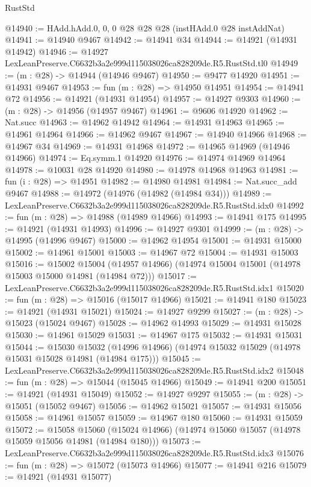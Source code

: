 \begin{lexlean}{RustStd}
\begin{coremodule}
@14940 := HAdd.hAdd.{0, 0, 0} @28 @28 @28 (instHAdd.{0} @28 instAddNat)
@14941 := @14940 @9467
@14942 := @14941 @34
@14944 := @14921 (@14931 @14942)
@14946 := @14927 LexLeanPreserve.C6632b3a2e999d115038026ca828209de.R5.RustStd.tl0
@14949 := (m : @28) -> @14944 (@14946 @9467)
@14950 := @9477 @14920
@14951 := @14931 @9467
@14953 := fun (m : @28) => @14950 @14951
@14954 := @14941 @72
@14956 := @14921 (@14931 @14954)
@14957 := @14927 @9303
@14960 := (m : @28) -> @14956 (@14957 @9467)
@14961 := @9606 @14920
@14962 := Nat.succ
@14963 := @14962 @14942
@14964 := @14931 @14963
@14965 := @14961 @14964
@14966 := @14962 @9467
@14967 := @14940 @14966
@14968 := @14967 @34
@14969 := @14931 @14968
@14972 := @14965 @14969 (@14946 @14966)
@14974 := Eq.symm.{1} @14920
@14976 := @14974 @14969 @14964
@14978 := @10031 @28 @14920
@14980 := @14978 @14968 @14963
@14981 := fun (i : @28) => @14951
@14982 := @14980 @14981
@14984 := Nat.succ_add @9467
@14988 := @14972 (@14976 (@14982 (@14984 @34)))
@14989 := LexLeanPreserve.C6632b3a2e999d115038026ca828209de.R5.RustStd.idx0
@14992 := fun (m : @28) => @14988 (@14989 @14966)
@14993 := @14941 @175
@14995 := @14921 (@14931 @14993)
@14996 := @14927 @9301
@14999 := (m : @28) -> @14995 (@14996 @9467)
@15000 := @14962 @14954
@15001 := @14931 @15000
@15002 := @14961 @15001
@15003 := @14967 @72
@15004 := @14931 @15003
@15016 := @15002
    @15004
    (@14957 @14966)
    (@14974 @15004 @15001 (@14978 @15003 @15000 @14981 (@14984 @72)))
@15017 := LexLeanPreserve.C6632b3a2e999d115038026ca828209de.R5.RustStd.idx1
@15020 := fun (m : @28) => @15016 (@15017 @14966)
@15021 := @14941 @180
@15023 := @14921 (@14931 @15021)
@15024 := @14927 @9299
@15027 := (m : @28) -> @15023 (@15024 @9467)
@15028 := @14962 @14993
@15029 := @14931 @15028
@15030 := @14961 @15029
@15031 := @14967 @175
@15032 := @14931 @15031
@15044 := @15030
    @15032
    (@14996 @14966)
    (@14974 @15032 @15029 (@14978 @15031 @15028 @14981 (@14984 @175)))
@15045 := LexLeanPreserve.C6632b3a2e999d115038026ca828209de.R5.RustStd.idx2
@15048 := fun (m : @28) => @15044 (@15045 @14966)
@15049 := @14941 @200
@15051 := @14921 (@14931 @15049)
@15052 := @14927 @9297
@15055 := (m : @28) -> @15051 (@15052 @9467)
@15056 := @14962 @15021
@15057 := @14931 @15056
@15058 := @14961 @15057
@15059 := @14967 @180
@15060 := @14931 @15059
@15072 := @15058
    @15060
    (@15024 @14966)
    (@14974 @15060 @15057 (@14978 @15059 @15056 @14981 (@14984 @180)))
@15073 := LexLeanPreserve.C6632b3a2e999d115038026ca828209de.R5.RustStd.idx3
@15076 := fun (m : @28) => @15072 (@15073 @14966)
@15077 := @14941 @216
@15079 := @14921 (@14931 @15077)

\end{coremodule}
\end{lexlean}
